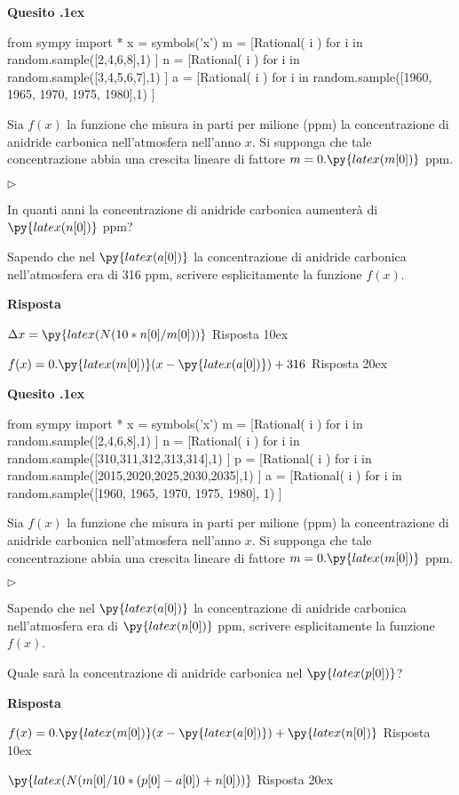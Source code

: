 \documentclass[11pt,twoside,a4paper]{article}
\newcommand{\mylabel}[1]{#1\hfill}
\renewenvironment{itemize}
  {\begin{list}{$\triangleright$}{%
   \setlength{\parskip}{0mm}
   \setlength{\topsep}{.4\baselineskip}
   \setlength{\rightmargin}{0mm}
   \setlength{\listparindent}{0mm}
   \setlength{\itemindent}{0mm}
   \setlength{\labelwidth}{2ex}
   \setlength{\itemsep}{.4\baselineskip}
   \setlength{\parsep}{0mm}
   \setlength{\partopsep}{0mm}
   \setlength{\labelsep}{1ex}
   \setlength{\leftmargin}{\labelwidth+\labelsep}
   \let\makelabel\mylabel}}{%
   \end{list}\vspace*{-1.3mm}}
\newcounter{quesito}
\newenvironment{question}{\bigskip\addtocounter{quesito}{1}\bigskip\bigskip\par\textbf{Quesito \thequesito.\kern1ex}}{\vspace{\parskip}}
\newenvironment{answer}{\par\textbf{Risposta\quad}}{\vspace{\parskip}}
\begin{document}
\begin{question}
\begin{pycode}
from sympy import *
x = symbols('x')
m = [Rational( i ) for i in random.sample([2,4,6,8],1) ]
n = [Rational( i ) for i in random.sample([3,4,5,6,7],1) ]
a = [Rational( i ) for i in random.sample([1960, 1965, 1970, 1975, 1980],1) ]
\end{pycode}
Sia $f(x)$ la funzione che misura in parti per milione (ppm) la concentrazione di anidride carbonica nell'atmosfera nell'anno $x$. Si supponga che tale concentrazione abbia una crescita lineare di fattore $m = 0.\py{latex(m[0])}$ ppm.
\begin{itemize}
\item[1.] In quanti anni la concentrazione di anidride carbonica aumenter\`a di $\py{latex(n[0])}$ ppm?
\item[2.] Sapendo che nel $\py{latex(a[0])}$ la concentrazione di anidride carbonica nell'atmosfera era di 316 ppm, scrivere esplicitamente la funzione $f(x)$.
\end{itemize}
\begin{answer}

{\color{blue}
$\Delta x = \py{latex(N(10*n[0]/m[0]))}$
\hfill Risposta 1\kern0ex}

\smallskip
{\color{blue}
$f(x) = 0.\py{latex(m[0])} ( x - \py{latex(a[0])}) + 316$
\hfill Risposta 2\kern0ex}

\end{answer}
\end{question}
\begin{question}
\begin{pycode}
from sympy import *
x = symbols('x')
m = [Rational( i ) for i in random.sample([2,4,6,8],1) ]
n = [Rational( i ) for i in random.sample([310,311,312,313,314],1) ]
p = [Rational( i ) for i in random.sample([2015,2020,2025,2030,2035],1) ]
a = [Rational( i ) for i in random.sample([1960, 1965, 1970, 1975, 1980], 1) ]
\end{pycode}
Sia $f(x)$ la funzione che misura in parti per milione (ppm) la concentrazione di anidride carbonica nell'atmosfera nell'anno $x$. Si supponga che tale concentrazione abbia una crescita lineare di fattore $m = 0.\py{latex(m[0])}$ ppm.
\begin{itemize}
\item[1.] Sapendo che nel $\py{latex(a[0])}$ la concentrazione di anidride carbonica nell'atmosfera era di $\py{latex(n[0])}$ ppm, scrivere esplicitamente la funzione $f(x)$.
\item[2.] Quale sar\`a la concentrazione di anidride carbonica nel $\py{latex(p[0])}$?
\end{itemize}
\begin{answer}

\smallskip
{\color{blue}
$f(x) = 0.\py{latex(m[0])} ( x - \py{latex(a[0])}) + \py{latex(n[0])}$
\hfill Risposta 1\kern0ex}

{\color{blue}
$\py{latex(N(m[0]/10*(p[0]-a[0])+n[0]))}$
\hfill Risposta 2\kern0ex}

\end{answer}
\end{question}
\end{document}
